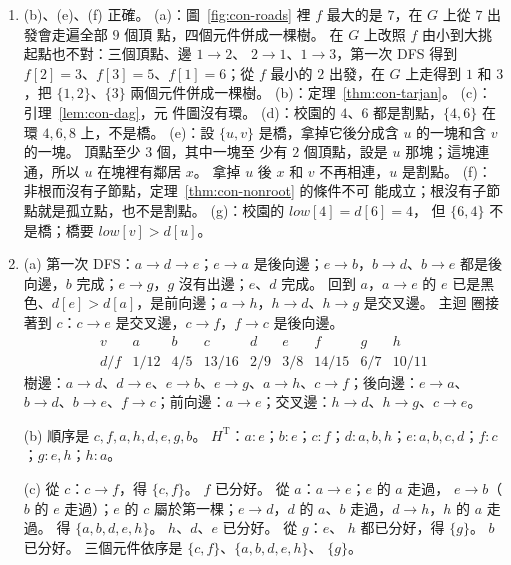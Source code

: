 \begin{enumerate}
\item (b)、(e)、(f) 正確。
(a)：圖~\ref{fig:con-roads} 裡 $f$ 最大的是 $7$，在 $G$ 上從 $7$ 出發會走遍全部 $9$ 個頂
點，四個元件併成一棵樹。 在 $G$ 上改照 $f$ 由小到大挑起點也不對：三個頂點、邊 $1 \to 2$、
$2 \to 1$、$1 \to 3$，第一次 DFS 得到 $f[2] = 3$、$f[3] = 5$、$f[1] = 6$；從 $f$ 最小的 $2$
出發，在 $G$ 上走得到 $1$ 和 $3$，把 $\{1, 2\}$、$\{3\}$ 兩個元件併成一棵樹。 (b)：定理~\ref{thm:con-tarjan}。 (c)：引理~\ref{lem:con-dag}，元
件圖沒有環。 (d)：校園的 $4$、$6$ 都是割點，$\{4, 6\}$ 在環 $4, 6, 8$ 上，不是橋。 (e)：設
$\{u, v\}$ 是橋，拿掉它後分成含 $u$ 的一塊和含 $v$ 的一塊。 頂點至少 $3$ 個，其中一塊至
少有 $2$ 個頂點，設是 $u$ 那塊；這塊連通，所以 $u$ 在塊裡有鄰居 $x$。 拿掉 $u$ 後 $x$ 和
$v$ 不再相連，$u$ 是割點。 (f)：非根而沒有子節點，定理~\ref{thm:con-nonroot} 的條件不可
能成立；根沒有子節點就是孤立點，也不是割點。 (g)：校園的 $\mathit{low}[4] = d[6] = 4$，
但 $\{6, 4\}$ 不是橋；橋要 $\mathit{low}[v] > d[u]$。

\item (a) 第一次 DFS：$a \to d \to e$；$e \to a$ 是後向邊；$e \to b$，$b \to d$、$b \to e$
都是後向邊，$b$ 完成；$e \to g$，$g$ 沒有出邊；$e$、$d$ 完成。 回到 $a$，$a \to e$ 的
$e$ 已是黑色、$d[e] > d[a]$，是前向邊；$a \to h$，$h \to d$、$h \to g$ 是交叉邊。 主迴
圈接著到 $c$：$c \to e$ 是交叉邊，$c \to f$，$f \to c$ 是後向邊。
\[
\begin{array}{c|cccccccc}
v & a & b & c & d & e & f & g & h \\
\hline
d/f & 1/12 & 4/5 & 13/16 & 2/9 & 3/8 & 14/15 & 6/7 & 10/11
\end{array}
\]
樹邊：$a \to d$、$d \to e$、$e \to b$、$e \to g$、$a \to h$、$c \to f$；後向邊：$e \to a$、
$b \to d$、$b \to e$、$f \to c$；前向邊：$a \to e$；交叉邊：$h \to d$、$h \to g$、$c \to e$。

(b) 順序是 $c, f, a, h, d, e, g, b$。 $H^{\mathrm{T}}$：$a: e$；$b: e$；$c: f$；$d: a, b,
h$；$e: a, b, c, d$；$f: c$；$g: e, h$；$h: a$。

(c) 從 $c$：$c \to f$，得 $\{c, f\}$。 $f$ 已分好。 從 $a$：$a \to e$；$e$ 的 $a$ 走過，
$e \to b$（$b$ 的 $e$ 走過）；$e$ 的 $c$ 屬於第一棵；$e \to d$，$d$ 的 $a$、$b$ 走過，$d
\to h$，$h$ 的 $a$ 走過。 得 $\{a, b, d, e, h\}$。 $h$、$d$、$e$ 已分好。 從 $g$：$e$、
$h$ 都已分好，得 $\{g\}$。 $b$ 已分好。 三個元件依序是 $\{c, f\}$、$\{a, b, d, e, h\}$、
$\{g\}$。


\end{enumerate}
